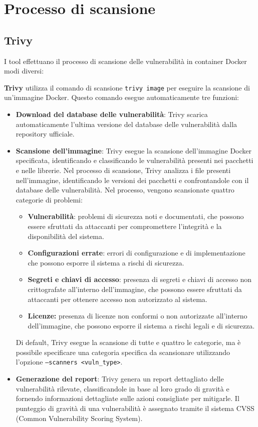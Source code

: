\section{Processo di scansione}
\subsection{Trivy}
I tool effettuano il processo di scansione delle vulnerabilità in container Docker modi diversi:

\textbf{Trivy} utilizza il comando di scansione \texttt{trivy image} per eseguire la scansione di un'immagine Docker. Questo comando esegue automaticamente tre funzioni:
\begin{itemize}
   \item \textbf{Download del database delle vulnerabilità}: Trivy scarica automaticamente l'ultima versione del database delle vulnerabilità dalla repository ufficiale.
   \item \textbf{Scansione dell'immagine}: Trivy esegue la scansione dell'immagine Docker specificata, identificando e classificando le vulnerabilità presenti nei pacchetti e nelle librerie. Nel processo di scansione, Trivy analizza i file presenti nell'immagine, identificando le versioni dei pacchetti e confrontandole con il database delle vulnerabilità. Nel processo, vengono scansionate quattro categorie di problemi:
         \begin{itemize}
            \item \textbf{Vulnerabilità}: problemi di sicurezza noti e documentati, che possono essere sfruttati da attaccanti per compromettere l'integrità e la disponibilità del sistema.
            \item \textbf{Configurazioni errate}: errori di configurazione e di implementazione che possono esporre il sistema a rischi di sicurezza.
            \item \textbf{Segreti e chiavi di accesso}: presenza di segreti e chiavi di accesso non crittografate all'interno dell'immagine, che possono essere sfruttati da attaccanti per ottenere accesso non autorizzato al sistema.
            \item \textbf{Licenze:} presenza di licenze non conformi o non autorizzate all'interno dell'immagine, che possono esporre il sistema a rischi legali e di sicurezza.
         \end{itemize}
         Di default, Trivy esegue la scansione di tutte e quattro le categorie, ma è possibile specificare una categoria specifica da scansionare utilizzando l'opzione \texttt{--scanners <vuln\_type>}.

   \item \textbf{Generazione del report}: Trivy genera un report dettagliato delle vulnerabilità rilevate, classificandole in base al loro grado di gravità e fornendo informazioni dettagliate sulle azioni consigliate per mitigarle. Il punteggio di gravità di una vulnerabilità è assegnato tramite il sistema CVSS (Common Vulnerability Scoring System).
\end{itemize}
